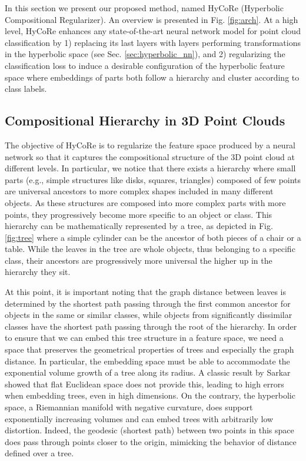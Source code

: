 \documentclass{article}
\begin{document}
In this section we present our proposed method, named HyCoRe (Hyperbolic Compositional Regularizer). An overview is presented in Fig. \ref{fig:arch}. At a high level, HyCoRe enhances any state-of-the-art neural network model for point cloud classification by 1) replacing its last layers with layers performing transformations in the hyperbolic space (see Sec. \ref{sec:hyperbolic_nn}), and 2) regularizing the classification loss to induce a desirable configuration of the hyperbolic feature space where embeddings of parts both follow a hierarchy and cluster according to class labels. 


\subsection{Compositional Hierarchy in 3D Point Clouds}

The objective of HyCoRe is to regularize the feature space produced by a neural network so that it captures the compositional structure of the 3D point cloud at different levels. In particular, we notice that there exists a hierarchy where small parts (e.g., simple structures like disks, squares, triangles) composed of few points are universal ancestors to more complex shapes included in many different objects. As these structures are composed into more complex parts with more points, they progressively become more specific to an object or class. This hierarchy can be mathematically represented by a tree, as depicted in Fig.\ref{fig:tree} where a simple cylinder can be the ancestor of both pieces of a chair or a table. While the leaves in the tree are whole objects, thus belonging to a specific class, their ancestors are progressively more universal the higher up in the hierarchy they sit.

At this point, it is important noting that the graph distance between leaves is determined by the shortest path passing through the first common ancestor for objects in the same or similar classes, while objects from significantly dissimilar classes have the shortest path passing through the root of the hierarchy. In order to ensure that we can embed this tree structure in a feature space, we need a space that preserves the geometrical properties of trees and especially the graph distance. In particular, the embedding space must be able to accommodate the exponential volume growth of a tree along its radius. A classic result by Sarkar \cite{sarkar2011low} showed that flat Euclidean space does not provide this, leading to high errors when embedding trees, even in high dimensions. On the contrary, the hyperbolic space, a Riemannian manifold with negative curvature, does support exponentially increasing volumes and can embed trees with arbitrarily low distortion. Indeed, the geodesic (shortest path) between two points in this space does pass through points closer to the origin, mimicking the behavior of distance defined over a tree.
\end{document}
